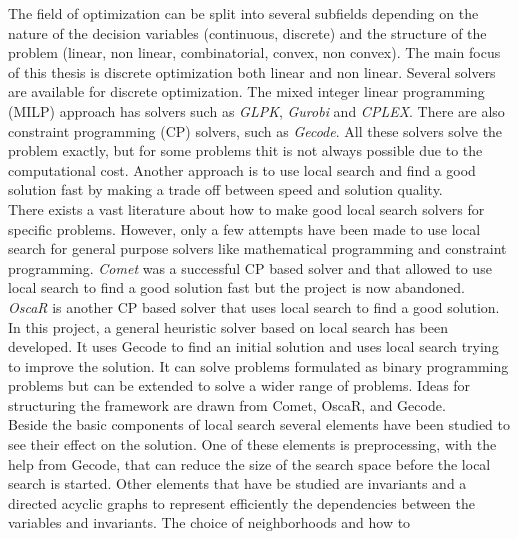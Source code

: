 The field of optimization can be split into several subfields depending on the nature of the decision variables 
(continuous, discrete) and the structure of the problem (linear, non linear, combinatorial, convex, non 
convex). The main focus of this thesis is discrete optimization both linear and non linear. 
Several solvers are available for discrete optimization. The mixed integer linear programming (MILP) approach has 
solvers such as \emph{GLPK}, \emph{Gurobi} and \emph{CPLEX}. There are also constraint programming (CP) solvers, such 
as \emph{Gecode}. All these solvers solve the problem exactly, but for some problems thit is not always possible due to 
the computational cost. Another approach is to use local search and find a good solution fast by making a trade off 
between speed and solution quality. \medskip \\ 
There exists a vast literature about how to make good local search solvers for specific problems.
However, only a few attempts have been made to use local search for general purpose solvers like 
mathematical programming and constraint programming. \emph{Comet} was a successful CP based solver and that allowed to 
use local search to find a good solution fast but the project is now abandoned.  \\ 
\emph{OscaR} is another CP based solver that uses local search to find a good solution. 
In this project, a general heuristic solver based on local search has been developed. It uses Gecode to find 
an initial solution and uses local search trying to improve the solution. It can solve problems formulated as binary 
programming problems but can be extended to solve a wider range of problems. Ideas for structuring the framework are 
drawn from Comet, OscaR, and Gecode. \medskip \\
Beside the basic components of local search several elements have been studied to see their effect on the solution.
 One of these elements is preprocessing, with the help from Gecode, that can reduce the size of the search space before 
the local search is started. Other elements that have be studied are invariants and a directed acyclic graphs to 
represent efficiently the dependencies between the variables and invariants. The choice of neighborhoods and how to 
